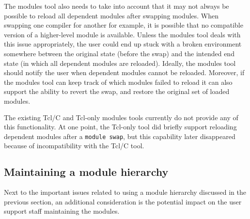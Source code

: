 The modules tool also needs to take into account that it may not always be
possible to reload all dependent modules after swapping modules. When swapping
one compiler for another for example, it is possible that no compatible version of a
higher-level  module is available. Unless the modules tool deals with this issue
appropriately, the user could end up stuck with a broken environment somewhere between
the original state (before the swap) and the intended end state (in which all
dependent modules are reloaded). Ideally, the modules tool should notify the user
when dependent modules cannot be reloaded. Moreover, if the modules tool can keep
track of which modules failed to reload it can also support the ability to revert
the swap, and restore the original set of loaded modules.

The existing Tcl/C and Tcl-only modules tools currently do not provide any of this
functionality. At one point, the Tcl-only tool did briefly support reloading
dependent modules after a \texttt{\small module swap}, but this capability later
disappeared because of incompatibility with the Tcl/C tool.




\subsection{Maintaining a module hierarchy}
\label{sec:maintaining_a_hierarchy}

Next to the important issues related to using a module hierarchy discussed in the
previous section, an additional consideration is the potential impact on the user
support staff maintaining the modules.

